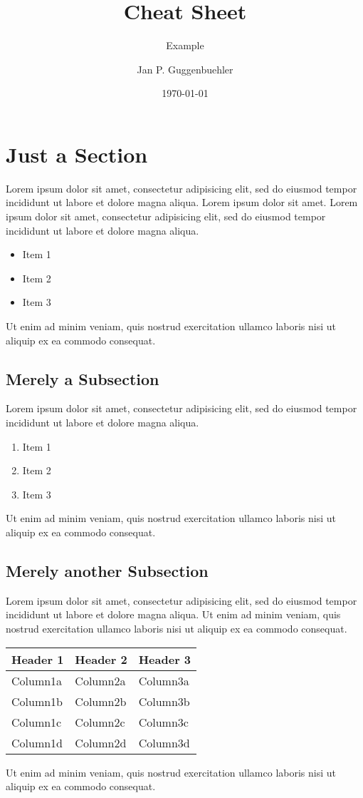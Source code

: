\documentclass{modernCS}
\begin{document}
\title{Cheat Sheet}
\subtitle{Example}
\author{Jan P. Guggenbuehler}
\date{\today{}}
\maketitle

\section{Just a Section}
Lorem ipsum dolor sit amet, consectetur adipisicing elit, sed do eiusmod tempor incididunt ut labore et dolore magna aliqua. Lorem ipsum dolor sit amet.
Lorem ipsum dolor sit amet, consectetur adipisicing elit, sed do eiusmod tempor incididunt ut labore et dolore magna aliqua.
\begin{itemize}
	\item Item 1
	\item Item 2
	\item Item 3
\end{itemize}
Ut enim ad minim veniam,
quis nostrud exercitation ullamco laboris nisi ut aliquip ex ea commodo
consequat.

\subsection{Merely a Subsection}
Lorem ipsum dolor sit amet, consectetur adipisicing elit, sed do eiusmod
tempor incididunt ut labore et dolore magna aliqua.
\begin{enumerate}
	\item Item 1
	\item Item 2
	\item Item 3
\end{enumerate}
Ut enim ad minim veniam,
quis nostrud exercitation ullamco laboris nisi ut aliquip ex ea commodo
consequat.

\subsection{Merely another Subsection}
Lorem ipsum dolor sit amet, consectetur adipisicing elit, sed do eiusmod
tempor incididunt ut labore et dolore magna aliqua. Ut enim ad minim veniam, quis nostrud exercitation ullamco laboris nisi ut aliquip ex ea commodo consequat.
\begin{center}
\begin{tabular}{lll}
\toprule
Header 1 & Header 2 & Header 3 \\
\midrule
Column1a & Column2a & Column3a \\
Column1b & Column2b & Column3b \\
Column1c & Column2c & Column3c \\
Column1d & Column2d & Column3d \\
\bottomrule
\end{tabular}
\end{center}
Ut enim ad minim veniam,
quis nostrud exercitation ullamco laboris nisi ut aliquip ex ea commodo
consequat.
\end{document}

